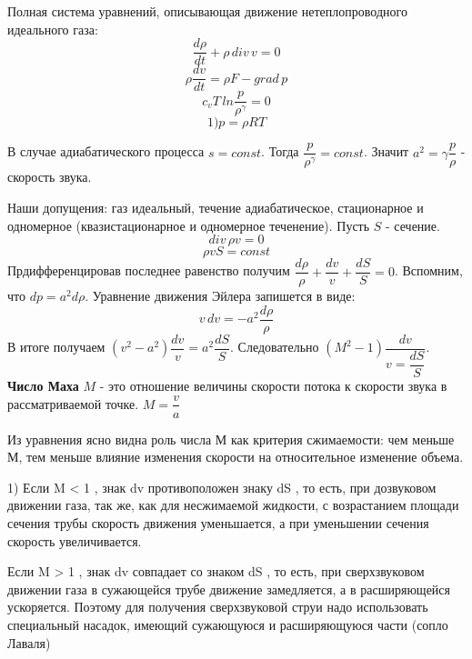 Полная система уравнений, описывающая движение нетеплопроводного идеального газа:
$$\dfrac{d \rho}{d t} + \rho \,div\, v = 0 $$
  $$  \rho \dfrac{d v}{d t} = \rho F - grad \,p $$
  $$c_v T\, ln\dfrac{p}{\rho^\gamma} = 0$$
  $$1) p = \rho R T$$

В случае адиабатического процесса $s = const$. Тогда $\dfrac{p}{\rho^\gamma} = const $. Значит $a^2 = \gamma \dfrac{p}{\rho}$ - скорость звука.

Наши допущения: газ идеальный, течение адиабатическое, стационарное и одномерное (квазистационарное и одномерное теченение). Пусть $S$ - сечение.
$$div\, \rho v = 0$$
$$\rho v S = const$$
Прдифференцировав последнее равенство получим $\dfrac{d \rho}{\rho} + \dfrac{d v}{v} + \dfrac{d S}{S} = 0$.
Вспомним, что $dp = a^2 d\rho$.
Уравнение движения Эйлера запишется в виде:$$v\, dv = -a^2 \dfrac{d \rho}{\rho}$$
В итоге получаем $(v^2 - a^2)\dfrac{d v}{v} = a^2 \dfrac{dS}{S}$. Следовательно $(M^2 - 1)\dfrac{d v}{v = \dfrac{d S}{S}}$.
\textbf{Число Маха} $M$ - это отношение величины скорости потока к скорости звука в рассматриваемой точке. $M = \dfrac{v}{a}$

Из уравнения ясно видна роль числа М как критерия сжимаемости: чем меньше М, тем меньше влияние изменения скорости  на относительное изменение объема.

1) Если M < 1 , знак dv противоположен знаку dS , то есть, при дозвуковом движении газа, так же, как для несжимаемой жидкости, с возрастанием площади сечения трубы скорость движения уменьшается, а при уменьшении сечения скорость увеличивается.

Если M > 1 , знак dv совпадает со знаком dS , то есть, при сверхзвуковом движении газа в сужающейся трубе движение замедляется, а в расширяющейся ускоряется. Поэтому для получения сверхзвуковой струи надо использовать специальный насадок, имеющий сужающуюся и расширяющуюся части (сопло Лаваля)

